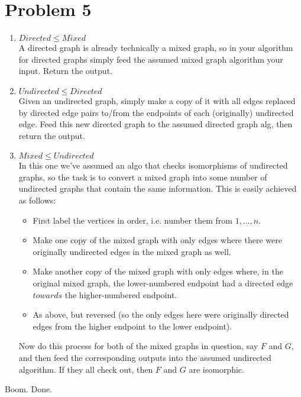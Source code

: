 \documentclass{article}
\providecommand{\prob}[1]{\section*{Problem #1}}
\begin{document}
\prob{5}
\begin{enumerate}
  \item $Directed \leq Mixed$\\
        A directed graph is already technically a mixed graph, 
        so in your algorithm for directed graphs simply feed the assumed mixed graph algorithm your input. 
        Return the output.
  \item $Undirected \leq Directed$\\
        Given an undirected graph, simply make a copy of it with all edges replaced by
        directed edge pairs to/from the endpoints of each (originally) undirected edge. 
        Feed this new directed graph to the assumed directed graph alg, 
        then return the output.
  \item $Mixed \leq Undirected$\\
        In this one we've assumed an algo that checks isomorphisms of undirected graphs,
        so the task is to convert a mixed graph into some number of undirected graphs that contain the same information. 
        This is easily achieved as follows:
        \begin{itemize}
          \item First label the vertices in order, i.e. number them from $1,\dots,n$.
          \item Make one copy of the mixed graph with only edges where there were originally undirected edges in the mixed graph as well.
          \item Make another copy of the mixed graph with only edges where, in the original mixed graph, the lower-numbered endpoint had a directed edge $towards$ the higher-numbered endpoint.
          \item As above, but reversed (so the only edges here were originally directed edges from the higher endpoint to the lower endpoint).
        \end{itemize}
        Now do this process for both of the mixed graphs in question, say $F$ and $G$, and then feed the corresponding outputs into the assumed undirected algorithm. If they all check out, then $F$ and $G$ are isomorphic.
\end{enumerate}
Boom. Done.
\end{document}
